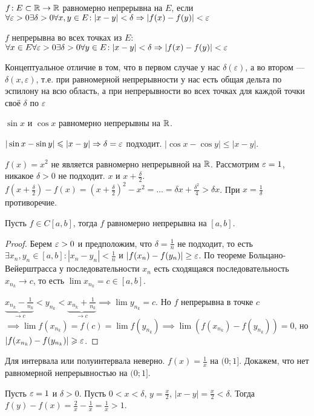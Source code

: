 \begin{definition}
    $f\!: E \subset \mathbb{R} \to \mathbb{R}$ равномерно непрерывна на  $E$, если  $\forall \varepsilon > 0 \exists \delta > 0 \forall x, y \in E\!: |x-y| < \delta \Rightarrow |f(x)-f(y)| < \varepsilon$
\end{definition}
\begin{definition}
    $f$ непрерывна во всех точках из  $E$:\\
    $\forall x \in E \forall \varepsilon > 0 \exists \delta > 0 \forall y \in E\!: |x-y| < \delta \Rightarrow |f(x)-f(y)| < \varepsilon$
\end{definition}
Концептуальное отличие в том, что в первом случае у нас $\delta(\varepsilon)$, а во втором --- $\delta(x, \varepsilon)$, т.е. при равномерной непрерывности у нас есть общая дельта по эспилону на всю область, а при непрерывности во всех точках для каждой точки своё $\delta$ по $\varepsilon$
\begin{example}
    $\sin x$ и  $\cos x$ равномерно непрерывны на  $\mathbb{R}$.

     $|\sin x - \sin y| \leqslant |x-y| \Rightarrow \delta = \varepsilon$ подходит. $|\cos x - \cos y| \le |x-y|$.
\end{example}
\begin{example}
    $f(x) = x^2$ не является равномерно непрерывной на $\mathbb{R}$. Рассмотрим  $\varepsilon = 1$, никакое  $\delta > 0$ не подходит.  $x$ и  $x + \frac{\delta}{2}$. $f(x + \frac{\delta}{2}) - f(x)  = (x+\frac{\delta}{2})^2 - x^2 = \ldots = \delta x + \frac{\delta^2}{4} > \delta x$.
    При $x = \frac{1}{\delta}$ противоречие. 
\end{example}
\begin{theorem}
    Пусть $f \in C[a, b]$, тогда $f$ равномерно непрерывна на  $[a, b]$.
\end{theorem}
\begin{proof}
    Берем $\varepsilon > 0$ и предположим, что  $\delta = \frac{1}{n}$ не подходит, то есть $\exists x_n, y_n \in [a, b]\!: |x_n - y_n| < \frac{1}{n}$ и $|f(x_n) - f(y_n)| \geq \varepsilon$. По теореме Больцано-Вейерштрасса у последовательности $x_n$ есть сходящаяся последовательность  $x_{n_k} \to c$, то есть  $\lim x_{n_k} = c \in [a, b]$.

    $\underbrace{x_{n_k} - \frac{1}{n_k}}_{\to c} < y_{n_k} < \underbrace{x_{n_k} + \frac{1}{n_k}}_{\to c} \implies \lim y_{n_k} = c$. Но $f$ непрерывна в точке  $c$  $\implies \lim f(x_{n_k}) = f(c) = \lim f(y_{n_k}) \implies \lim (f(x_{n_k}) - f(y_{n_k})) = 0$, но $|f(x_{n_k}) - f(y_{n_k})| \geqslant \varepsilon$.
\end{proof}
\begin{remark}
    Для интервала или полуинтервала неверно. $f(x) = \frac{1}{x}$ на $(0; 1]$. Докажем, что нет равномерной непрерывностью на  $(0; 1]$. 

    Пусть  $\varepsilon = 1$ и  $\delta > 0$. Пусть  $0 < x < \delta$,  $y = \frac{x}{2}$, $|x-y| = \frac{x}{2} < \delta$. Тогда $f(y) - f(x) = \frac{2}{x} - \frac{1}{x} = \frac{1}{x} > 1$.
\end{remark}


